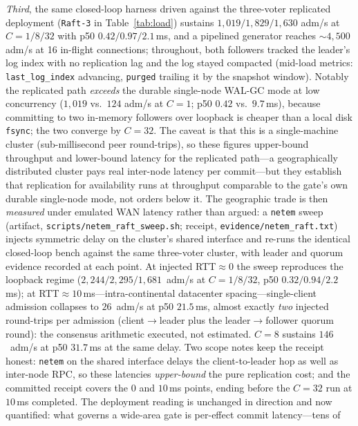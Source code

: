 \documentclass[10pt,journal,compsoc]{IEEEtran}
\begin{document}
\emph{Third}, the same closed-loop harness driven against the three-voter
replicated deployment (\texttt{Raft-3} in Table~\ref{tab:load}) sustains
$1{,}019/1{,}829/1{,}630$ adm/s at $C{=}1/8/32$ with p50
$0.42/0.97/2.1$\,ms, and a pipelined generator reaches ${\sim}4{,}500$ adm/s
at 16 in-flight connections; throughout, both followers tracked the leader's
log index with no replication lag and the log stayed compacted (mid-load
metrics: \texttt{last\_log\_index} advancing, \texttt{purged} trailing it by
the snapshot window). Notably the replicated path \emph{exceeds} the durable
single-node WAL-GC mode at low concurrency ($1{,}019$ vs.\ $124$ adm/s at
$C{=}1$; p50 $0.42$ vs.\ $9.7$\,ms), because committing to two in-memory
followers over loopback is cheaper than a local disk \texttt{fsync}; the two
converge by $C{=}32$. The caveat is that this is a single-machine cluster
(sub-millisecond peer round-trips), so these figures upper-bound throughput
and lower-bound latency for the replicated path---a geographically
distributed cluster pays real inter-node latency per commit---but they
establish that replication for availability runs at throughput comparable to
the gate's own durable single-node mode, not orders below it. The geographic
trade is then \emph{measured} under emulated WAN latency rather than argued:
a \texttt{netem} sweep (artifact, \texttt{scripts/netem\_raft\_sweep.sh};
receipt, \texttt{evidence/netem\_raft.txt}) injects symmetric delay on the
cluster's shared interface and re-runs the identical closed-loop bench
against the same three-voter cluster, with leader and quorum evidence
recorded at each point. At injected RTT${\approx}0$ the sweep reproduces the
loopback regime ($2{,}244/2{,}295/1{,}681$~adm/s at $C{=}1/8/32$, p50
$0.32/0.94/2.2$\,ms); at RTT${\approx}10$\,ms---intra-continental datacenter
spacing---single-client admission collapses to $26$~adm/s at p50
$21.5$\,ms, almost exactly \emph{two} injected round-trips per admission
(client${\to}$leader plus the leader${\to}$follower quorum round): the
consensus arithmetic executed, not estimated. $C{=}8$ sustains $146$~adm/s
at p50 $31.7$\,ms at the same delay. Two scope notes keep the receipt
honest: \texttt{netem} on the shared interface delays the client-to-leader
hop as well as inter-node RPC, so these latencies \emph{upper-bound} the
pure replication cost; and the committed receipt covers the $0$ and
$10$\,ms points, ending before the $C{=}32$ run at $10$\,ms completed. The
deployment reading is unchanged in direction and now quantified: what
governs a wide-area gate is per-effect commit latency---tens of
\end{document}
